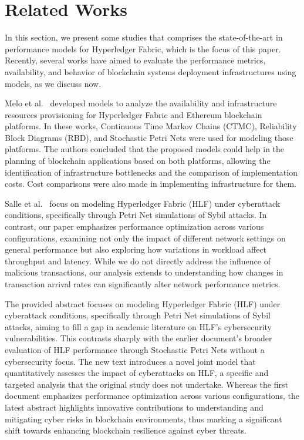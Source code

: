 \section{Related Works}
\label{sec:related_works}

In this section, we present some studies that comprises the state-of-the-art in performance models for Hyperledger Fabric, which is the focus of this paper. Recently, several works have aimed to evaluate the performance metrics, availability, and behavior of blockchain systems deployment infrastructures using models, as we discuss now.

Melo et al.~\cite{melo_computing2022,melo_supercomp2021} developed models to analyze the availability and infrastructure resources provisioning for Hyperledger Fabric and Ethereum blockchain platforms. In these works, Continuous Time Markov Chains (CTMC), Reliability Block Diagrams (RBD), and Stochastic Petri Nets were used for modeling those platforms. The authors concluded that the proposed models could help in the planning of blockchain applications based on both platforms, allowing the identification of infrastructure bottlenecks and the comparison of implementation costs. Cost comparisons were also made in implementing infrastructure for them.

Salle et al.~\cite{la2023joint} focus on modeling Hyperledger Fabric (HLF) under cyberattack conditions, specifically through Petri Net simulations of Sybil attacks. In contrast, our paper emphasizes performance optimization across various configurations, examining not only the impact of different network settings on general performance but also exploring how variations in workload affect throughput and latency. While we do not directly address the influence of malicious transactions, our analysis extends to understanding how changes in transaction arrival rates can significantly alter network performance metrics.

The provided abstract focuses on modeling Hyperledger Fabric (HLF) under cyberattack conditions, specifically through Petri Net simulations of Sybil attacks, aiming to fill a gap in academic literature on HLF’s cybersecurity vulnerabilities. This contrasts sharply with the earlier document's broader evaluation of HLF performance through Stochastic Petri Nets without a cybersecurity focus. The new text introduces a novel joint model that quantitatively assesses the impact of cyberattacks on HLF, a specific and targeted analysis that the original study does not undertake. Whereas the first document emphasizes performance optimization across various configurations, the latest abstract highlights innovative contributions to understanding and mitigating cyber risks in blockchain environments, thus marking a significant shift towards enhancing blockchain resilience against cyber threats.

